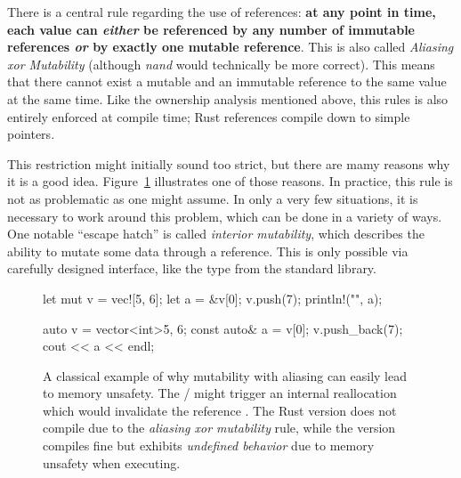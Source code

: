 {{There is a central rule regarding the use of references: \textbf{at any point in time, each value can \emph{either} be referenced by any number of immutable references \emph{or} by exactly one mutable reference}.
This is also called \emph{Aliasing xor Mutability} (although \emph{nand} would technically be more correct).
This means that there cannot exist a mutable and an immutable reference to the same value at the same time.
Like the ownership analysis mentioned above, this rules is also entirely enforced at compile time; Rust references compile down to simple pointers.

This restriction might initially sound too strict, but there are mamy reasons why it is a good idea.
Figure~\ref{fig:vector-bad} illustrates one of those reasons.
In practice, this rule is not as problematic as one might assume.
In only a very few situations, it is necessary to work around this problem, which can be done in a variety of ways.
One notable \enquote{escape hatch} is called \emph{interior mutability}, which describes the ability to mutate some data through a  reference.
This is only possible via carefully designed interface, like the type  from the standard library.

\begin{figure}[b]
  \centering
    \begin{minipage}[t]{.49\textwidth}
    \begin{rustcode}
      let mut v = vec![5, 6];
      let a = &v[0];
      v.push(7);
      println!("{}", a);
    \end{rustcode}
  \end{minipage}
  \begin{minipage}[t]{.49\textwidth}
    \begin{cppcode}
      auto v = vector<int>{5, 6};
      const auto& a = v[0];
      v.push_back(7);
      cout << a << endl;
    \end{cppcode}
  \end{minipage}
  \caption{
    A classical example of why mutability with aliasing can easily lead to memory unsafety.
    The / might trigger an internal reallocation which would invalidate the reference .
    The Rust version does not compile due to the \emph{aliasing xor mutability} rule, while the \cpp version compiles fine but exhibits \emph{undefined behavior} due to memory unsafety when executing.
  }
  \label{fig:vector-bad}
\end{figure}

}}
